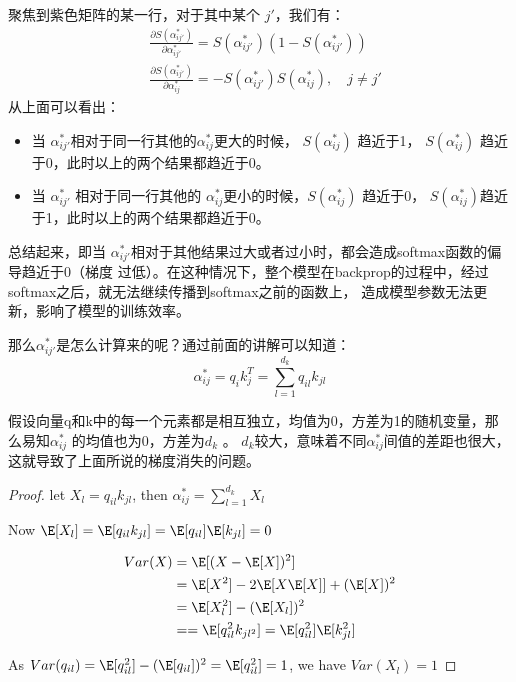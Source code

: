 \documentclass[11pt]{article}
\begin{document}
\begin{enumerate}
聚焦到紫色矩阵的某一行，对于其中某个 \(j'\)，我们有：
\begin{align*}
&\frac{\partial S(\alpha_{ij'}^*)}{\partial\alpha_{ij'}^*}=S(\alpha_{ij'}^*)(1-S(\alpha_{ij'}^*))\\
&\frac{\partial S(\alpha_{ij'}^*)}{\partial \alpha^*_{ij}}=-S(\alpha_{ij'}^*)S(\alpha_{ij}^*),\quad j\neq j'
\end{align*}
从上面可以看出：
\begin{itemize}
\item 当 \(\alpha_{ij'}^*\)相对于同一行其他的\(\alpha_{ij}^*\)更大的时候， \(S(\alpha_{ij}^*)\) 趋近于1， \(S(\alpha_{ij}^*)\) 趋近于0，此时以上的两个结果都趋近于0。
\item 当  \(\alpha_{ij'}^*\) 相对于同一行其他的 \(\alpha_{ij}^*\)更小的时候，\(S(\alpha_{ij}^*)\) 趋近于0，
\(S(\alpha_{ij}^*)\)趋近于1，此时以上的两个结果都趋近于0。
\end{itemize}

总结起来，即当 \(\alpha_{ij'}^*\)相对于其他结果过大或者过小时，都会造成softmax函数的偏导趋近于0（梯度
过低）。在这种情况下，整个模型在backprop的过程中，经过softmax之后，就无法继续传播到softmax之前的函数上，
造成模型参数无法更新，影响了模型的训练效率。 

那么\(\alpha_{ij'}^*\)是怎么计算来的呢？通过前面的讲解可以知道：
\begin{equation*}
\alpha_{ij}^*=q_ik_j^T=\sum_{l=1}^{d_k}q_{il}k_{jl}
\end{equation*}

假设向量q和k中的每一个元素都是相互独立，均值为0，方差为1的随机变量，那么易知\(\alpha_{ij}^*\) 的均值也为0，方差为\(d_k\) 。 
\(d_k\)较大，意味着不同\(\alpha_{ij}^*\)间值的差距也很大，这就导致了上面所说的梯度消失的问题。

\begin{proof}
let \(X_l=q_{il}k_{jl}\), then \(\alpha_{ij}^*=\sum_{l=1}^{d_k}X_l\)

Now \(\E[X_l]=\E[q_{il}k_{jl}]=\E[q_{il}]\E[k_{jl}]=0\)

\begin{align*}
Var(X)&=\E[(X-\E[X])^2]\\
&=\E[X^2]-2\E[X\E[X]]+(\E[X])^2\\
&=\E[X_l^2]-(\E[X_l])^2\\
&==\E[q_{il}^2k_{jl^2}]=\E[q_{il}^2]\E[k_{jl}^2]
\end{align*}

As \(Var(q_{il})=\E[q_{il}^2]-(\E[q_{il}])^2=\E[q_{il}^2]=1\),
we have \(Var(X_l)=1\)


\end{proof}
\end{enumerate}
\end{document}
